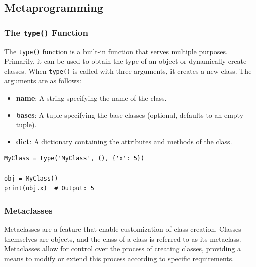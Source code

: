 \subsection{Metaprogramming}

\subsubsection{The \texttt{type()} Function}
The \texttt{type()} function is a built-in function that serves multiple purposes. Primarily, it can be used to obtain the type of an object or dynamically create classes. When \texttt{type()} is called with three arguments, it creates a new class. The arguments are as follows:

\begin{itemize}
    \item \textbf{name}: A string specifying the name of the class.
    \item \textbf{bases}: A tuple specifying the base classes (optional, defaults to an empty tuple).
    \item \textbf{dict}: A dictionary containing the attributes and methods of the class.
\end{itemize}


\begin{codebox}
\begin{verbatim}
MyClass = type('MyClass', (), {'x': 5})

obj = MyClass()
print(obj.x)  # Output: 5
\end{verbatim}
\end{codebox}


\subsubsection{Metaclasses}
Metaclasses are a feature that enable customization of class creation. Classes themselves are objects, and the class of a class is referred to as its metaclass. Metaclasses allow for control over the process of creating classes, providing a means to modify or extend this process according to specific requirements.

